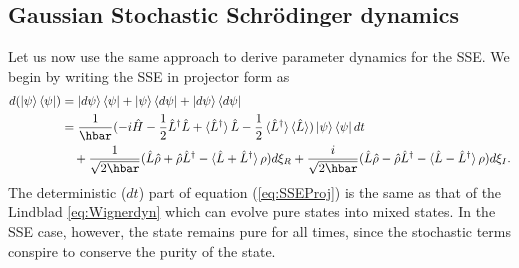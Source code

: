\documentclass[12pt]{iopart} %
\begin{document}
%
\subsection{Gaussian Stochastic Schr\"odinger dynamics} \label{sec:GaussSSE}
Let us now use the same approach to derive parameter dynamics for the SSE. We begin by writing the SSE in projector form as
\begin{align} \label{eq:SSEProj}
	d(\ket{\psi}\bra{\psi})&=\ket{d \psi}\bra{\psi}+\ket{\psi}\bra{d\psi}+\ket{d \psi}\bra{d \psi} \nonumber \\ 
	&=\frac{1}{\hbar}(-{i}\hat{H} -\frac{1}{2 }\hat{L}^{\dagger}\hat{L}+\braket{\hat{L}^{\dagger}}\hat{L} - \frac{1}{2}\braket{\hat{L}^{\dagger}}\braket{\hat{L}})\ket {\psi} \bra{\psi}dt\\
		&\quad+\frac{1}{\sqrt{2 \hbar}}(\hat{L} \hat{\rho} +\hat{\rho} \hat{L}^{\dagger}-\braket{\hat{L}+\hat{L}^{\dagger}}\rho)d\xi_R+\frac{i}{\sqrt{2 \hbar}}(\hat{L} \hat{\rho} -\hat{\rho} \hat{L}^{\dagger}-\braket{\hat{L}-\hat{L}^{\dagger}}\rho)d\xi_I. \nonumber
\end{align}
The deterministic ($dt$) part of equation (\ref{eq:SSEProj}) is the same as that of the Lindblad \cref{eq:Wignerdyn} which can evolve pure states into mixed states. In the SSE case, however, the state remains pure for all times, since the stochastic terms conspire to conserve the purity of the state.
 
\end{document}
